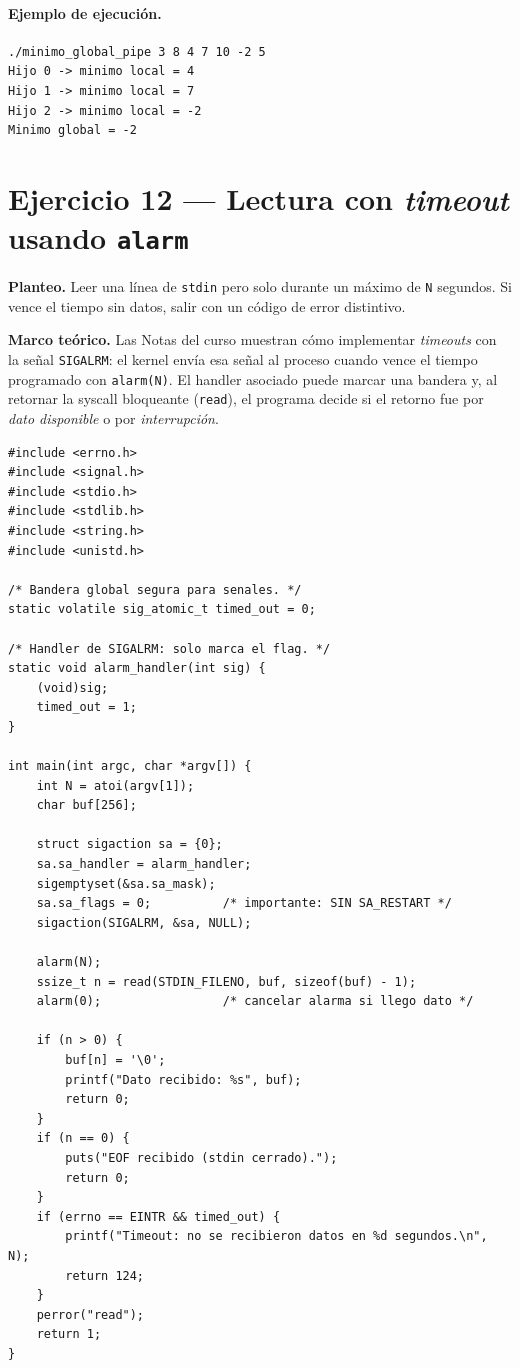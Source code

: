 \documentclass[11pt,a4paper]{article}
\begin{document}
\paragraph{Ejemplo de ejecución.}

\begin{lstlisting}[style=outstyle]
./minimo_global_pipe 3 8 4 7 10 -2 5
Hijo 0 -> minimo local = 4
Hijo 1 -> minimo local = 7
Hijo 2 -> minimo local = -2
Minimo global = -2
\end{lstlisting}

\section{Ejercicio 12 --- Lectura con \emph{timeout} usando \texttt{alarm}}

\textbf{Planteo.} Leer una línea de \texttt{stdin} pero solo durante
un máximo de \texttt{N} segundos. Si vence el tiempo sin datos, salir
con un código de error distintivo.

\textbf{Marco teórico.} Las Notas del curso muestran cómo implementar
\emph{timeouts} con la señal \texttt{SIGALRM}: el kernel envía esa
señal al proceso cuando vence el tiempo programado con
\texttt{alarm(N)}. El handler asociado puede marcar una bandera y, al
retornar la syscall bloqueante (\texttt{read}), el programa decide si
el retorno fue por \emph{dato disponible} o por \emph{interrupción}.

\begin{lstlisting}[style=cstyle]
#include <errno.h>
#include <signal.h>
#include <stdio.h>
#include <stdlib.h>
#include <string.h>
#include <unistd.h>

/* Bandera global segura para senales. */
static volatile sig_atomic_t timed_out = 0;

/* Handler de SIGALRM: solo marca el flag. */
static void alarm_handler(int sig) {
    (void)sig;
    timed_out = 1;
}

int main(int argc, char *argv[]) {
    int N = atoi(argv[1]);
    char buf[256];

    struct sigaction sa = {0};
    sa.sa_handler = alarm_handler;
    sigemptyset(&sa.sa_mask);
    sa.sa_flags = 0;          /* importante: SIN SA_RESTART */
    sigaction(SIGALRM, &sa, NULL);

    alarm(N);
    ssize_t n = read(STDIN_FILENO, buf, sizeof(buf) - 1);
    alarm(0);                 /* cancelar alarma si llego dato */

    if (n > 0) {
        buf[n] = '\0';
        printf("Dato recibido: %s", buf);
        return 0;
    }
    if (n == 0) {
        puts("EOF recibido (stdin cerrado).");
        return 0;
    }
    if (errno == EINTR && timed_out) {
        printf("Timeout: no se recibieron datos en %d segundos.\n", N);
        return 124;
    }
    perror("read");
    return 1;
}
\end{lstlisting}
\end{document}
